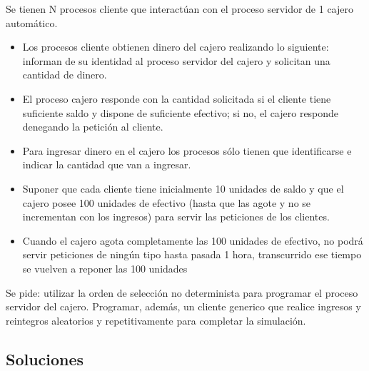 \documentclass[12pt]{article}
\begin{document}
\begin{description}
            \begin{ejercicio}
                Se tienen N procesos cliente que interactúan con el proceso servidor de 1 cajero automático.
                \begin{itemize}
                    \item Los procesos cliente obtienen dinero del cajero realizando lo siguiente: informan de su identidad al proceso servidor del cajero y solicitan una cantidad de dinero.
                    \item El proceso cajero responde con la cantidad solicitada si el cliente tiene suficiente saldo y dispone de suficiente efectivo; si no, el cajero responde denegando la petición al cliente.
                    \item Para ingresar dinero en el cajero los procesos sólo tienen que identificarse e indicar la cantidad que van a ingresar.
                    \item Suponer que cada cliente tiene inicialmente 10 unidades de saldo y que el cajero posee 100 unidades de efectivo (hasta que las agote y no se incrementan con los ingresos) para servir las peticiones de los clientes.
                    \item Cuando el cajero agota completamente las 100 unidades de efectivo, no podrá servir peticiones de ningún tipo hasta pasada 1 hora, transcurrido ese tiempo se vuelven a reponer las 100 unidades
                \end{itemize}
                Se pide: utilizar la orden de selección no determinista para programar el proceso servidor del cajero. Programar, además, un cliente generico que realice ingresos y reintegros aleatorios y repetitivamente para completar la simulación.
            \end{ejercicio}
    \end{description}

    \newpage
    \setcounter{ejercicio}{0}
    \subsection*{Soluciones}
\end{document}
